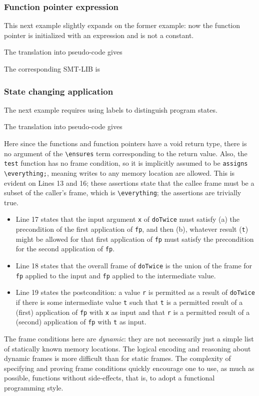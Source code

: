 {\subsubsection{Function pointer expression}

This next example slightly expands on the former example: now the function pointer is initialized with an expression and is not a constant.


The translation into pseudo-code gives


The corresponding SMT-LIB is


\subsubsection{State changing application}
The next example requires using labels to distinguish program states.


The translation into pseudo-code gives


Here since the functions and function pointers have a void return type, there is no argument of the \lstinline|\ensures| term corresponding to the return value. Also, the \lstinline|test| function has no frame condition, 
so it is implicitly assumed to be \lstinline|assigns \everything;|, meaning writes to any memory location are allowed. This is evident on
Lines 13 and 16; these assertions state that the callee frame must be 
a subset of the caller's frame, which is \lstinline|\everything|;
the assertions are trivially true. 
\begin{itemize}
	\item Line 17 states that the input argument \lstinline|x| of \lstinline|doTwice|
	must satisfy (a) the precondition of the first application of
	\lstinline|fp|, and then (b), whatever result (\lstinline|t|) might be allowed
	for that first application of \lstinline|fp| must satisfy the
	precondition for the second application of \lstinline|fp|.
	\item Line 18 states that the overall frame of \lstinline|doTwice| is
	the union of the frame for \lstinline|fp| applied to the input and
	\lstinline|fp| applied to the intermediate value.
	\item Line 19 states the postcondition: a value \lstinline|r| is 
	permitted as a result of \lstinline|doTwice| if there is some
	intermediate value \lstinline|t| such that \lstinline|t| is a permitted result of a (first) application of \lstinline|fp| with \lstinline|x| as input and that \lstinline|r| is a permitted result
	of a (second) application of \lstinline|fp| with \lstinline|t| as input.
\end{itemize}
The frame conditions here are \emph{dynamic}: they are not 
necessarily just a simple list of statically known memory locations. The logical encoding and
reasoning about dynamic frames is more difficult than for static frames.
The complexity of specifying and proving frame conditions quickly encourage one to use, as much as possible, functions without side-effects,
that is, to adopt a functional programming style.


}
